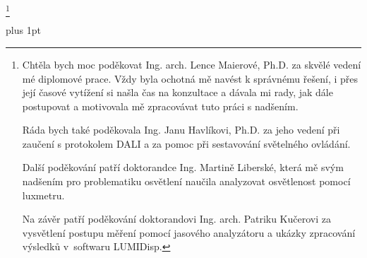 \thanks {           %
   Chtěla bych moc poděkovat Ing. arch. Lence Maierové, Ph.D. za skvělé vedení mé diplomové prace.
   Vždy byla ochotná mě navést k správnému řešení, i přes její časové vytížení si našla čas na konzultace a dávala mi rady,
   jak dále postupovat a motivovala mě zpracovávat tuto práci s nadšením.

   Ráda bych také poděkovala Ing. Janu Havlíkovi, Ph.D. za jeho vedení při zaučení s protokolem DALI
   a za pomoc při sestavování světelného ovládání.

   Další poděkování patří doktorandce Ing. Martině Liberské,
   která mě svým nadšením pro problematiku osvětlení naučila analyzovat osvětlenost pomocí luxmetru.

   Na závěr patří poděkování doktorandovi Ing. arch. Patriku Kučerovi za vysvětlení postupu měření pomocí jasového analyzátoru
   a ukázky zpracování výsledků v~softwaru LUMIDisp.


}



\ifx\usedraft\undefined
\else
   \draft
\fi


\parskip=3pt plus 1pt %




\makefront  %

